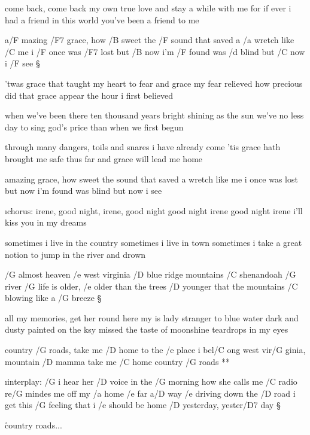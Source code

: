 come back, come back my own true love
and stay a while with me
for if ever i had a friend in this world
you've been a friend to me




a/F mazing /F7 grace, how /B sweet the /F sound
that saved a /a wretch like /C me
i /F once was /F7 lost but /B now i'm /F found
was /d blind but /C now i /F see \S

'twas grace that taught my heart to fear
and grace my fear relieved
how precious did that grace appear
the hour i first believed \s

when we've been there ten thousand years
bright shining as the sun
we've no less day to sing god's price
than when we first begun \s

through many dangers, toils and snares
i have already come
'tis grace hath brought me safe thus far
and grace will lead me home \s

amazing grace, how sweet the sound
that saved a wretch like me
i once was lost but now i'm found
was blind but now i see




{\i chorus: }
irene, good night, irene, good night
good night irene good night irene
i'll kiss you in my dreams \s

sometimes i live in the country
sometimes i live in town
sometimes i take a great notion
to jump in the river and drown




/G almost heaven /e west virginia
/D blue ridge mountains
/C shenandoah /G river
/G life is older, /e older than the trees
/D younger that the mountains
/C blowing like a /G breeze \S

all my memories, get her round here
my is lady
stranger to blue water
dark and dusty painted on the ksy
missed the taste of moonshine
teardrops in my eyes

\R country /G roads, take me /D home
   to the /e place i bel/C ong
   west vir/G ginia, mountain /D mamma
   take me /C home country /G roads **

{\i interplay:} \s
/G i hear her /D voice in the /G morning how she calls me
/C radio re/G mindes me off my /a home /e far a/D way
/e driving down the /D road i get this /G feeling that i /e should
be home /D yesterday, yester/D7 day \S

\r country roads...



